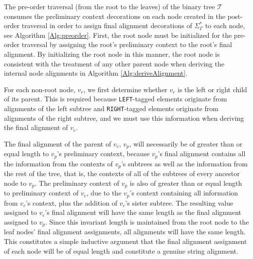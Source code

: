 \documentclass{bmcart}
\begin{document}
The pre-order traversal (from the root to the leaves) of the binary tree $\mathcal{T}$ consumes the preliminary context decorations on each node created in the post-order traversal in order to assign final alignment decorations of $\Sigma_{\Gamma}^{*}$ to each node, see Algorithm \ref{Alg:preorder}.
First, the root node must be initialized for the pre-order traversal by assigning the root's preliminary context to the root's final alignment.
By initializing the root node in this manner, the root node is consistent with the treatment of any other parent node when deriving the internal node alignments in Algorithm \ref{Alg:deriveAlignment}.

For each non-root node, $v_c$, we first determine whether $v_c$ is the left or right child of its parent.
This is required because \texttt{LEFT}-tagged elements originate from alignments of the left subtree and \texttt{RIGHT}-tagged elements originate from alignments of the right subtree, and we must use this information when deriving the final alignment of $v_c$.

The final alignment of the parent of $v_c$, $v_p$, will necessarily be of greater than or equal length to $v_p$'s preliminary context, because $v_p$'s final alignment contains all the information from the contexts of $v_p$'s subtrees as well as the information from the rest of the tree, that is, the contexts of all of the subtrees of every ancestor node to $v_p$.
The preliminary context of $v_p$ is also of greater than or equal length to preliminary context of $v_c$, due to the $v_p$'s context containing all information from $v_c$'s context, plus the addition of $v_c$'s sister subtree.
The resulting value assigned to $v_c$'s final alignment will have the same length as the final alignment assigned to $v_p$.
Since this invariant length is maintained from the root node to the leaf nodes' final alignment assignments, all alignments will have the same length.
This constitutes a simple inductive argument that the final alignment assignment of each node will be of equal length and constitute a genuine string alignment.
\end{document}
